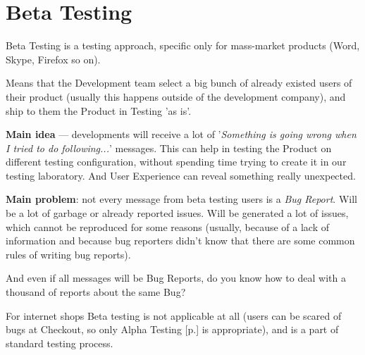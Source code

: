 \section{Beta Testing}
\label{sec:Beta Testing}

Beta Testing is a testing approach, specific only for mass-market products (Word, Skype, Firefox so on).

Means that the Development team select a big bunch of already existed users of their product (usually this happens outside of the development company), and ship to them the Product in Testing 'as is'.

\textbf{Main idea} — developments will receive a lot of '\textit{Something is going wrong when I tried to do following...}' messages. This can help in testing the Product on different testing configuration, without spending time trying to create it in our testing laboratory. And User Experience can reveal something really unexpected.

\textbf{Main problem}: not every message from beta testing users is a \emph{Bug Report}. Will be a lot of garbage or already reported issues. Will be generated a lot of issues, which cannot be reproduced for some reasons (usually, because of a lack of information and because bug reporters didn't know that there are some common rules of writing bug reports).

And even if all messages will be Bug Reports, do you know how to deal with a thousand of reports about the same Bug? 

For internet shops Beta testing is not applicable at all (users can be scared of bugs at Checkout, so only Alpha Testing [p.\pageref{sec:Alpha Testing}] is appropriate), and is a part of standard testing process.